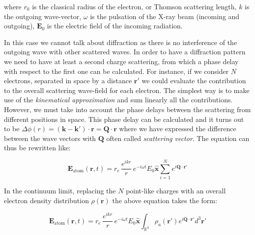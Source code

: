 where $r_0$ is the classical radius of the electron, or Thomson scattering length, $k$ is the outgoing wave-vector, $\omega$ is the pulsation of the 
X-ray beam (incoming and outgoing), $\mathbf{E}_0$ is the electric field of the incoming radiation.

In this case we cannot talk about diffraction as there is no interference of the outgoing wave with other scattered waves. In order 
to have a diffraction pattern we need to have at least a second charge scattering, from which a phase 
delay with respect to the first one can be calculated. For instance, if we consider $N$ electrons, separated in space 
by a distance $\mathbf{r'}$ we could evaluate the contribution to the overall scattering wave-field for each electron. 
The simplest way is to make use of the \textit{kinematical approximation} and sum linearly all the contributions. However, we must 
take into account the phase delays between the scattering from different positions in space. 
This phase delay can be calculated and it turns out to be $\Delta\phi(r) = (\mathbf k - \mathbf {k'})\cdot \mathbf r = \mathbf Q \cdot \mathbf r$ 
where we have expressed the difference between the wave vectors with $\mathbf{Q}$ often called \textit{scattering vector}.
The equation can thus be rewritten like: 

\begin{equation}
    \mathbf{E}_{\text{atom}}(\mathbf{r},t) 
    = r_e \, \frac{e^{ikr}}{r} \, e^{-i \omega t} 
    E_0 \mathbf{\hat{x}}
    \sum_{i = 1}^{N} e^{i \mathbf{Q} \cdot \mathbf{r}'} 
    \label{eq:scattering_electrons}
\end{equation}

In the continuum limit, replacing the $N$ point-like charges with an overall electron density distribution $\rho(\mathbf r)$ 
the above equation takes the form: 

\begin{equation}
    \mathbf{E}_{\text{atom}}(\mathbf{r},t) 
    = r_e \, \frac{e^{ikr}}{r} \, e^{-i \omega t} 
    E_0 \mathbf{\hat{x}}
    \int_{\mathbb{R}^3} \rho_a(\mathbf r') e^{i \mathbf{Q} \cdot \mathbf{r}'}  d^3 \mathbf r'
    \label{eq:scattering_atom}
\end{equation}

